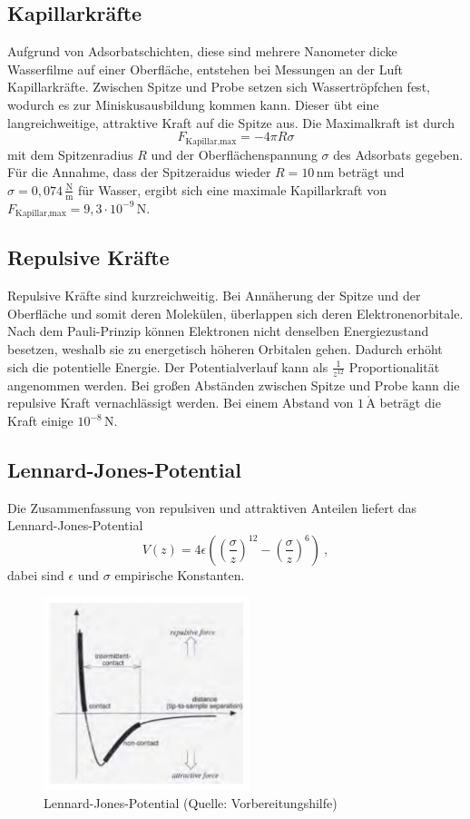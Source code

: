 \subsection{Kapillarkräfte}
Aufgrund von Adsorbatschichten, diese sind mehrere Nanometer dicke Wasserfilme auf einer Oberfläche, entstehen bei Messungen an der Luft Kapillarkräfte. Zwischen Spitze und Probe setzen sich Wassertröpfchen fest, wodurch es zur Miniskusausbildung kommen kann. Dieser übt eine langreichweitige, attraktive Kraft auf die Spitze aus. Die Maximalkraft ist durch 
$$F_\text{Kapillar,max}=-4\pi R\sigma$$
mit dem Spitzenradius $R$ und der Oberflächenspannung $\sigma$ des Adsorbats gegeben. Für die Annahme, dass der Spitzeraidus wieder $R=10\,$nm beträgt und $\sigma=0,074\,\frac{\text{N}}{\text{m}}$ für Wasser, ergibt sich eine maximale Kapillarkraft von $F_\text{Kapillar,max}=9,3\cdot 10^{-9}\,$N.

\subsection{Repulsive Kräfte}
Repulsive Kräfte sind kurzreichweitig. Bei Annäherung der Spitze und der Oberfläche und somit deren Molekülen, überlappen sich deren Elektronenorbitale. Nach dem Pauli-Prinzip können Elektronen nicht denselben Energiezustand besetzen, weshalb sie zu energetisch höheren Orbitalen gehen. Dadurch erhöht sich die potentielle Energie. Der Potentialverlauf kann als $\frac{1}{z^{12}}$ Proportionalität angenommen werden. Bei großen Abständen zwischen Spitze und Probe kann die repulsive Kraft vernachlässigt werden. Bei einem Abstand von $1\,\mathring{\text{A}}$ beträgt die Kraft einige $10^{-8}\,$N.

\subsection{Lennard-Jones-Potential}
Die Zusammenfassung von repulsiven und attraktiven Anteilen liefert das Lennard-Jones-Potential
$$V(z)=4\epsilon\left(\left(\frac{\sigma}{z}\right)^{12}-\left(\frac{\sigma}{z}\right)^{6}\right)~,$$
dabei sind $\epsilon$ und $\sigma$ empirische Konstanten.
\begin{figure}[H]
    \centering
    \includegraphics[width=60mm,scale=0.5]{Rasterkraftmikroskop/include/Lennard-Jones-Potential.PNG}
    \caption{Lennard-Jones-Potential (Quelle: Vorbereitungshilfe)} 
    \label{fig:Lennard-Jones-Potential}
\end{figure}

